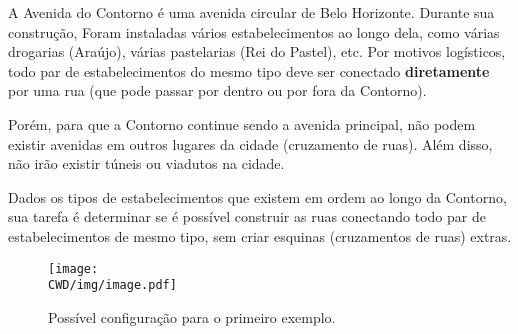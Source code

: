 %

A Avenida do Contorno é uma avenida circular de Belo Horizonte. Durante sua construção, Foram instaladas vários estabelecimentos ao longo dela, como várias drogarias (Araújo), várias pastelarias (Rei do Pastel), etc. Por motivos logísticos, todo par de estabelecimentos do mesmo tipo deve ser conectado \textbf{diretamente} por uma rua (que pode passar por dentro ou por fora da Contorno).

Porém, para que a Contorno continue sendo a avenida principal, não podem existir avenidas em outros lugares da cidade (cruzamento de ruas). Além disso, não irão existir túneis ou viadutos na cidade.

Dados os tipos de estabelecimentos que existem em ordem ao longo da Contorno, sua tarefa é determinar se é possível construir as ruas conectando todo par de estabelecimentos de mesmo tipo, sem criar esquinas (cruzamentos de ruas) extras.

\begin{figure}[H]
  \centering
  \texttt{[image: \\CWD/img/image.pdf]}
  \caption{Possível configuração para o primeiro exemplo.}
\end{figure}

%
%

%
%



\sampleio
